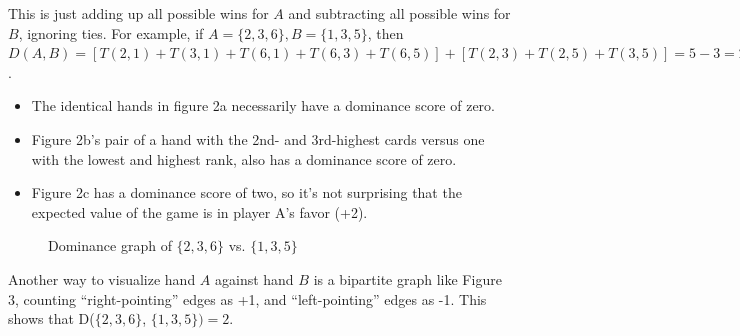 \documentclass[11pt, oneside]{article} 	%
\begin{document}
This is just adding up all possible wins for $A$ and subtracting all possible wins for $B$, ignoring ties.  For example, if $A = \{2, 3,6\}, B = \{1,3,5\}$, then $D(A,B) = [T(2,1) + T(3,1) + T(6,1) + T(6,3) + T(6,5)] + [T(2,3) + T(2,5) + T(3,5)] = 5 - 3 = 2$.


\begin{itemize}
\item The identical hands in figure 2a necessarily have a dominance score of zero.
\item Figure 2b's pair of a hand with the 2nd- and 3rd-highest cards versus one with the lowest and highest rank, also has a dominance score of zero.
\item Figure 2c has a dominance score of two, so it's not surprising that the expected value of the game is in player A's favor (+2).
\end{itemize}


\begin{figure}
\centering
{}
\label{fig:bipartite}
\caption{Dominance graph of $\{2,3,6\}$ vs. $\{1,3,5\}$}
\end{figure}

Another way to visualize hand $A$ against hand $B$ is a bipartite graph like Figure 3, counting ``right-pointing'' edges as +1, and ``left-pointing'' edges as -1.  This shows that D($\{2,3,6\}$, $\{1,3,5\}) = 2$.
\end{document}
